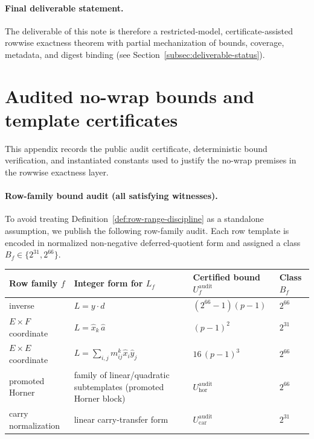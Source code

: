 ﻿\documentclass[11pt]{article}
\newcommand{\wt}[1]{\widehat{#1}}
\begin{document}
\paragraph{Final deliverable statement.}
The deliverable of this note is therefore a restricted-model,
certificate-assisted rowwise exactness theorem with partial mechanization of
bounds, coverage, metadata, and digest binding (see
Section~\ref{subsec:deliverable-status}).

\appendix

\section{Audited no-wrap bounds and template certificates}
\label{app:audit-certificate}
This appendix records the public audit certificate, deterministic bound
verification, and instantiated constants used to justify the no-wrap
premises in the rowwise exactness layer.

\paragraph{Row-family bound audit (all satisfying witnesses).}
To avoid treating Definition~\ref{def:row-range-discipline} as a standalone
assumption, we publish the following row-family audit. Each row template is
encoded in normalized non-negative deferred-quotient form and assigned a
class \(B_f\in\{2^{31},2^{66}\}\).

\begin{center}
\begin{tabular}{|l|l|l|l|}
\hline
Row family \(f\) & Integer form for \(L_f\) & Certified bound \(U_f^{\mathrm{audit}}\) & Class \(B_f\) \\
\hline
inverse & \(L=y\cdot d\) & \((2^{66}-1)(p-1)\) & \(2^{66}\) \\
\hline
\(E\times F\) coordinate & \(L=\wt{x}_k\,\wt{a}\) & \((p-1)^2\) & \(2^{31}\) \\
\hline
\(E\times E\) coordinate & \(L=\sum_{i,j} m_{ij}^k \wt{x}_i\wt{y}_j\) & \(16\,(p-1)^3\) & \(2^{66}\) \\
\hline
promoted Horner & family of linear/quadratic subtemplates (promoted Horner block) & \(U_{\mathrm{hor}}^{\mathrm{audit}}\) & \(2^{66}\) \\
\hline
carry normalization & linear carry-transfer form & \(U_{\mathrm{car}}^{\mathrm{audit}}\) & \(2^{31}\) \\
\hline
\end{tabular}
\end{center}
\end{document}
